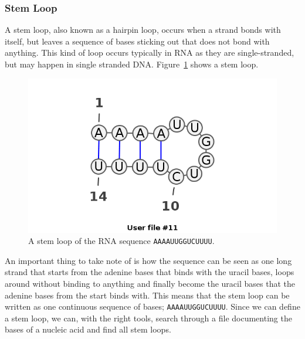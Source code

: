 \subsubsection{Stem Loop}
A stem loop, also known as a hairpin loop, occurs when a strand bonds with 
itself, but leaves a sequence of bases sticking out that does not bond with anything. 
This kind of loop occurs typically in RNA as they are single-stranded, but may 
happen in single stranded DNA. Figure~\ref{fig:stem-loop} 
shows a stem loop.
\begin{figure}[h!]\centering
\includegraphics[scale=0.3]{./lib/stem-loop.png}
\caption{A stem loop of the RNA sequence {\tt AAAAUUGGUCUUUU}.}
\label{fig:stem-loop}
\end{figure} 
An important thing to take note of is how the sequence can be seen as one 
long strand that starts from the adenine bases that binds with the uracil bases, 
loops around without binding to anything and finally become the uracil bases 
that the adenine bases from the start binds with. This means that the 
stem loop can be written as one continuous sequence of bases; {\tt AAAAUUGGUCUUUU}. 
Since we can define a stem loop, we can, with the right tools, search through 
a file documenting the bases of a nucleic acid and find all stem loops.

